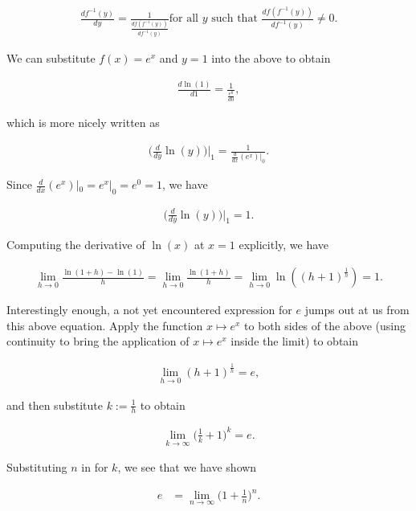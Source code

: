 \begin{align*}
    \frac{df^{-1}(y)}{dy} = \frac{1}{\frac{df(f^{-1}(y))}{df^{-1}(y)}} \text{for all $y$ such that $\frac{df(f^{-1}(y))}{df^{-1}(y)} \neq 0$}.
\end{align*}

We can substitute $f(x) = e^x$ and $y = 1$ into the above to obtain

\begin{align*}
    \frac{d\ln(1)}{d1} = \frac{1}{\frac{e^0}{d0}},
\end{align*}

which is more nicely written as

\begin{align*}
    \Big( \frac{d}{dy} \ln(y) \Big)\Big|_1 = \frac{1}{\frac{d}{dx}(e^x)|_0}.
\end{align*}

Since $\frac{d}{dx}(e^x)|_0 = e^x|_0 = e^0 = 1$, we have

\begin{align*}
    \Big(\frac{d}{dy} \ln(y)\Big)\Big|_1 = 1.
\end{align*}

Computing the derivative of $\ln(x)$ at $x = 1$ explicitly, we have

\begin{align*}
    \lim_{h \rightarrow 0} \frac{\ln(1 + h) - \ln(1)}{h} = \lim_{h \rightarrow 0} \frac{\ln(1 + h)}{h} = \lim_{h \rightarrow 0} \ln((h + 1)^\frac{1}{h}) = 1.
\end{align*}

Interestingly enough, a not yet encountered expression for $e$ jumps out at us from this above equation. Apply the function $x \mapsto e^x$ to both sides of the above (using continuity to bring the application of $x \mapsto e^x$ inside the limit) to obtain

\begin{align*}
    \lim_{h \rightarrow 0} (h + 1)^{\frac{1}{h}} = e,
\end{align*}

and then substitute $k := \frac{1}{h}$ to obtain

\begin{align*}
   \lim_{k \rightarrow \infty} \Big( \frac{1}{k} + 1 \Big)^k = e.
\end{align*}

Substituting $n$ in for $k$, we see that we have shown

\begin{align*}
    e &= \lim_{n \rightarrow \infty} \Big(1 + \frac{1}{n} \Big)^n.
\end{align*}

